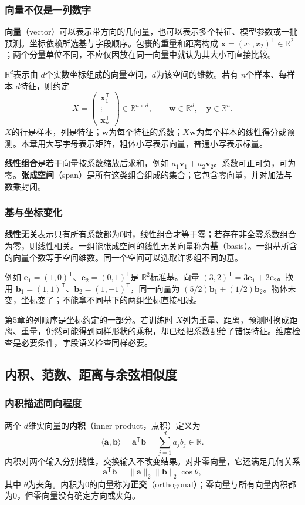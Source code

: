 \documentclass[UTF8,fontset=none,zihao=-4,a4paper]{ctexart}
\newcommand{\term}[1]{\textbf{#1}}
\numberwithin{equation}{section}
\numberwithin{figure}{section}
\begin{document}
\subsubsection{向量不仅是一列数字}
\term{向量}（vector）可以表示带方向的几何量，也可以表示多个特征、模型参数或一批预测。坐标依赖所选基与字段顺序。包裹的重量和距离构成 $\symbf x=(x_1,x_2)^{\mathsf T}\in\mathbb R^2$；两个分量单位不同，不应仅因放在同一向量中就认为其大小可直接比较。

$\mathbb R^d$表示由 $d$个实数坐标组成的向量空间，$d$为该空间的维数。若有 $n$个样本、每样本 $d$特征，则约定
\[
 X=\begin{pmatrix}\symbf x_1^{\mathsf T}\\\vdots\\\symbf x_n^{\mathsf T}\end{pmatrix}
 \in\mathbb R^{n\times d},\qquad
 \symbf w\in\mathbb R^d,\quad \symbf y\in\mathbb R^n.
\]
$X$的行是样本，列是特征；$\symbf w$为每个特征的系数；$X\symbf w$为每个样本的线性得分或预测。本章用大写字母表示矩阵，粗体小写表示向量，普通小写表示标量。

\term{线性组合}是若干向量按系数缩放后求和，例如 $a_1\symbf v_1+a_2\symbf v_2$。系数可正可负，可为零。\term{张成空间}（span）是所有这类组合组成的集合；它包含零向量，并对加法与数乘封闭。

\subsubsection{基与坐标变化}
\term{线性无关}表示只有所有系数都为0时，线性组合才等于零；若存在非全零系数组合为零，则线性相关。一组能张成空间的线性无关向量称为\term{基}（basis）。一组基所含的向量个数等于空间维数。同一个空间可以选取许多组不同的基。

例如 $\symbf e_1=(1,0)^{\mathsf T}$、$\symbf e_2=(0,1)^{\mathsf T}$是 $\mathbb R^2$标准基。向量 $(3,2)^{\mathsf T}=3\symbf e_1+2\symbf e_2$。换用 $\symbf b_1=(1,1)^{\mathsf T}$、$\symbf b_2=(1,-1)^{\mathsf T}$，同一向量为 $(5/2)\symbf b_1+(1/2)\symbf b_2$。物体未变，坐标变了；不能拿不同基下的两组坐标直接相减。

第5章的列顺序是坐标约定的一部分。若训练时 $X$列为重量、距离，预测时换成距离、重量，仍然可能得到同样形状的乘积，却已经把系数配给了错误特征。维度检查是必要条件，字段语义检查同样必要。

\subsection{内积、范数、距离与余弦相似度}
\subsubsection{内积描述同向程度}
两个 $d$维实向量的\term{内积}（inner product，点积）定义为
\[
 \langle\symbf a,\symbf b\rangle=\symbf a^{\mathsf T}\symbf b
 =\sum_{j=1}^d a_jb_j\in\mathbb R.
\]
内积对两个输入分别线性，交换输入不改变结果。对非零向量，它还满足几何关系
\[
 \symbf a^{\mathsf T}\symbf b=\|\symbf a\|_2\|\symbf b\|_2\cos\theta,
\]
其中 $\theta$为夹角。内积为0的向量称为\term{正交}（orthogonal）；零向量与所有向量内积都为0，但零向量没有确定方向或夹角。
\end{document}
